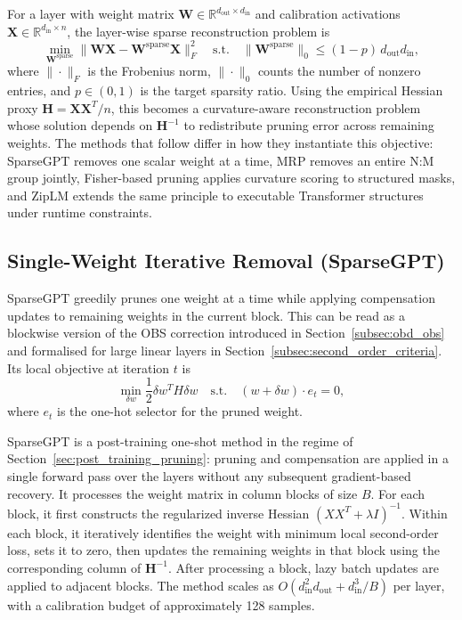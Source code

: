 For a layer with weight matrix $\mathbf{W} \in \mathbb{R}^{d_{\text{out}} \times d_{\text{in}}}$ and calibration activations $\mathbf{X} \in \mathbb{R}^{d_{\text{in}} \times n}$, the layer-wise sparse reconstruction problem is
\begin{equation}
	\min_{\mathbf{W}^{\text{sparse}}}
	\|\mathbf{W}\mathbf{X} - \mathbf{W}^{\text{sparse}}\mathbf{X}\|_F^2
	\quad \text{s.t.} \quad
	\|\mathbf{W}^{\text{sparse}}\|_0 \leq (1-p)\, d_{\text{out}} d_{\text{in}},
\end{equation}
where $\|\cdot\|_F$ is the Frobenius norm, $\|\cdot\|_0$ counts the number of nonzero entries, and $p \in (0,1)$ is the target sparsity ratio. Using the empirical Hessian proxy $\mathbf{H} = \mathbf{X}\mathbf{X}^T / n$, this becomes a curvature-aware reconstruction problem whose solution depends on $\mathbf{H}^{-1}$ to redistribute pruning error across remaining weights. The methods that follow differ in how they instantiate this objective: SparseGPT removes one scalar weight at a time, MRP removes an entire N:M group jointly, Fisher-based pruning applies curvature scoring to structured masks, and ZipLM extends the same principle to executable Transformer structures under runtime constraints.

\subsection{Single-Weight Iterative Removal (SparseGPT)}

SparseGPT \cite{frantar2023sparsegpt} greedily prunes one weight at a time while applying compensation updates to remaining weights in the current block. This can be read as a blockwise version of the OBS correction introduced in Section~\ref{subsec:obd_obs} and formalised for large linear layers in Section~\ref{subsec:second_order_criteria}. Its local objective at iteration $t$ is
\begin{equation}\label{eq:srp}
	\min_{\delta w} \frac{1}{2}\delta w^T H \delta w
	\quad\text{s.t.}\quad
	(w+\delta w)\cdot e_t = 0,
\end{equation}
where $e_t$ is the one-hot selector for the pruned weight.

SparseGPT is a post-training one-shot method in the regime of Section~\ref{sec:post_training_pruning}: pruning and compensation are applied in a single forward pass over the layers without any subsequent gradient-based recovery. It processes the weight matrix in column blocks of size $B$. For each block, it first constructs the regularized inverse Hessian $(XX^T + \lambda I)^{-1}$. Within each block, it iteratively identifies the weight with minimum local second-order loss, sets it to zero, then updates the remaining weights in that block using the corresponding column of $\mathbf{H}^{-1}$. After processing a block, lazy batch updates are applied to adjacent blocks. The method scales as $O(d_{\text{in}}^2 d_{\text{out}} + d_{\text{in}}^3/B)$ per layer, with a calibration budget of approximately 128 samples.

